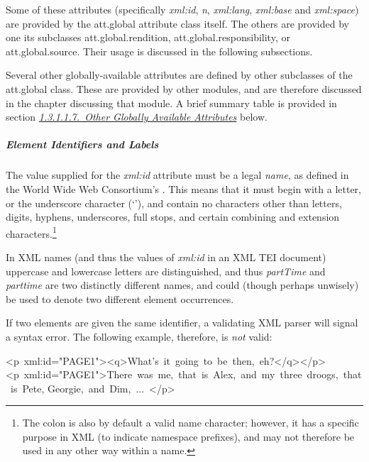 \par
Some of these attributes (specifically {\itshape xml:id}, {\itshape n}, {\itshape xml:lang}, {\itshape xml:base} and {\itshape xml:space}) are provided by the \textsf{att.global} attribute class itself. The others are provided by one its subclasses \textsf{att.global.rendition}, \textsf{att.global.responsibility}, or \textsf{att.global.source}. Their usage is discussed in the following subsections.\par
Several other globally-available attributes are defined by other subclasses of the \textsf{att.global} class. These are provided by other modules, and are therefore discussed in the chapter discussing that module. A brief summary table is provided in section \textit{\hyperref[STGAothers]{1.3.1.1.7.\ Other Globally Available Attributes}} below.
\subparagraph[{Element Identifiers and Labels}]{Element Identifiers and Labels}\label{STGAid}\par
The value supplied for the {\itshape xml:id} attribute must be a legal \textit{name}, as defined in the World Wide Web Consortium's . This means that it must begin with a letter, or the underscore character (‘\textunderscore ’), and contain no characters other than letters, digits, hyphens, underscores, full stops, and certain combining and extension characters.\footnote{The colon is also by default a valid name character; however, it has a specific purpose in XML (to indicate namespace prefixes), and may not therefore be used in any other way within a name.}\par
In XML names (and thus the values of {\itshape xml:id} in an XML TEI document) uppercase and lowercase letters are distinguished, and thus \textit{partTime} and \textit{parttime} are two distinctly different names, and could (though perhaps unwisely) be used to denote two different element occurrences.\par
If two elements are given the same identifier, a validating XML parser will signal a syntax error. The following example, therefore, is \textit{not} valid: \par\bgroup\exampleFont \begin{shaded}\noindent\mbox{}\newline
<p xml:id="PAGE1"><q>What's it going to be then, eh?</q></p> \newline
<p xml:id="PAGE1">There was me, that is Alex, and my three droogs, that is Pete,\newline
Georgie, and Dim, ... </p>\end{shaded}\egroup\par \par
